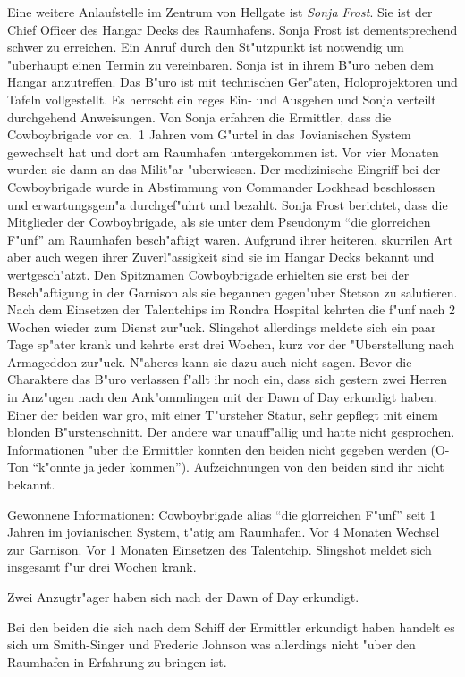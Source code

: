 
Eine weitere Anlaufstelle im Zentrum von Hellgate ist \emph{Sonja Frost}. Sie ist der Chief Officer des Hangar Decks des Raumhafens. Sonja Frost ist dementsprechend schwer zu erreichen. Ein Anruf durch den St"utzpunkt ist notwendig um "uberhaupt einen Termin zu vereinbaren. Sonja ist in ihrem B"uro neben dem Hangar anzutreffen. Das B"uro ist mit technischen Ger"aten, Holoprojektoren und Tafeln vollgestellt. Es herrscht ein reges Ein- und Ausgehen und Sonja verteilt durchgehend Anweisungen. Von Sonja erfahren die Ermittler, dass die Cowboybrigade vor ca.~1 Jahren vom G"urtel in das Jovianischen System gewechselt hat und dort am Raumhafen untergekommen ist. Vor vier Monaten wurden sie dann an das Milit"ar "uberwiesen. Der medizinische Eingriff bei der Cowboybrigade wurde in Abstimmung von Commander Lockhead beschlossen und erwartungsgem"a\3 durchgef"uhrt und bezahlt. Sonja Frost berichtet, dass die Mitglieder der Cowboybrigade, als sie unter dem Pseudonym "`die glorreichen F"unf"' am Raumhafen besch"aftigt waren. Aufgrund ihrer heiteren, skurrilen Art aber auch wegen ihrer Zuverl"assigkeit sind sie im Hangar Decks bekannt und wertgesch"atzt.  Den Spitznamen Cowboybrigade erhielten sie erst bei der Besch"aftigung in der Garnison als sie begannen gegen"uber Stetson zu salutieren. Nach dem Einsetzen der Talentchips im Rondra Hospital kehrten die f"unf nach 2 Wochen wieder zum Dienst zur"uck. Slingshot allerdings meldete sich ein paar Tage sp"ater krank und kehrte erst drei Wochen, kurz vor der "Uberstellung nach Armageddon zur"uck. N"aheres kann sie dazu auch nicht sagen. Bevor die Charaktere das B"uro verlassen f"allt ihr noch ein, dass sich gestern zwei Herren in Anz"ugen nach den Ank"ommlingen mit der Dawn of Day erkundigt haben. Einer der beiden war gro\3, mit einer T"ursteher Statur, sehr gepflegt mit einem blonden B"urstenschnitt. Der andere war unauff"allig und hatte nicht gesprochen. Informationen "uber die Ermittler konnten den beiden nicht gegeben werden (O-Ton "`k"onnte ja jeder kommen"'). Aufzeichnungen von den beiden sind ihr nicht bekannt.


\begin{remarks}
	Gewonnene Informationen: Cowboybrigade alias "`die glorreichen F"unf"' seit 1 Jahren im jovianischen System, t"atig am Raumhafen. Vor 4 Monaten Wechsel zur Garnison. Vor 1 Monaten Einsetzen des Talentchip. Slingshot meldet sich insgesamt f"ur drei Wochen krank. 
	
	Zwei Anzugtr"ager haben sich nach der Dawn of Day erkundigt.

	Bei den beiden die sich nach dem Schiff der Ermittler erkundigt haben handelt es sich um Smith-Singer und Frederic Johnson was allerdings nicht "uber den Raumhafen in Erfahrung zu bringen ist.
\end{remarks}


